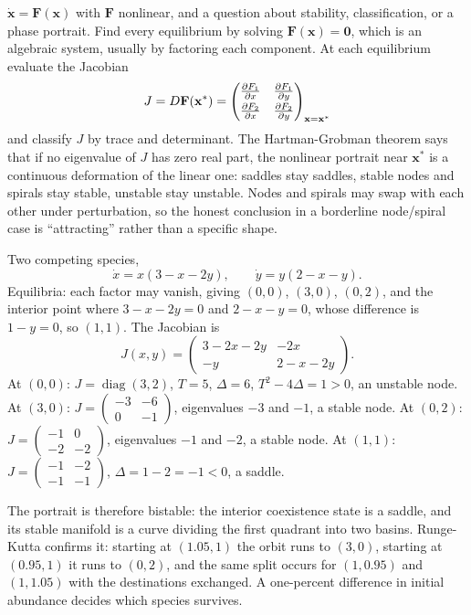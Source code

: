 \cue $\dot{\mathbf{x}}=\mathbf{F}(\mathbf{x})$ with $\mathbf{F}$ nonlinear, and a question about stability, classification, or a phase portrait.
\method Find every equilibrium by solving $\mathbf{F}(\mathbf{x})=\mathbf{0}$, which is an algebraic system, usually by factoring each component. At each equilibrium evaluate the Jacobian
\[J=D\mathbf{F}(\mathbf{x}^{*})=\begin{pmatrix}\frac{\partial F_1}{\partial x}&\frac{\partial F_1}{\partial y}\\[3pt]\frac{\partial F_2}{\partial x}&\frac{\partial F_2}{\partial y}\end{pmatrix}_{\mathbf{x}=\mathbf{x}^{*}}\]
and classify $J$ by trace and determinant. The Hartman-Grobman theorem says that if no eigenvalue of $J$ has zero real part, the nonlinear portrait near $\mathbf{x}^{*}$ is a continuous deformation of the linear one: saddles stay saddles, stable nodes and spirals stay stable, unstable stay unstable. Nodes and spirals may swap with each other under perturbation, so the honest conclusion in a borderline node/spiral case is ``attracting'' rather than a specific shape.

\begin{worked}
Two competing species,
\[\dot x=x(3-x-2y),\qquad \dot y=y(2-x-y).\]
Equilibria: each factor may vanish, giving $(0,0)$, $(3,0)$, $(0,2)$, and the interior point where $3-x-2y=0$ and $2-x-y=0$, whose difference is $1-y=0$, so $(1,1)$. The Jacobian is
\[J(x,y)=\begin{pmatrix}3-2x-2y&-2x\\-y&2-x-2y\end{pmatrix}.\]
At $(0,0)$: $J=\operatorname{diag}(3,2)$, $T=5$, $\Delta=6$, $T^{2}-4\Delta=1>0$, an unstable node. At $(3,0)$: $J=\begin{pmatrix}-3&-6\\0&-1\end{pmatrix}$, eigenvalues $-3$ and $-1$, a stable node. At $(0,2)$: $J=\begin{pmatrix}-1&0\\-2&-2\end{pmatrix}$, eigenvalues $-1$ and $-2$, a stable node. At $(1,1)$: $J=\begin{pmatrix}-1&-2\\-1&-1\end{pmatrix}$, $\Delta=1-2=-1<0$, a saddle.

The portrait is therefore bistable: the interior coexistence state is a saddle, and its stable manifold is a curve dividing the first quadrant into two basins. Runge-Kutta confirms it: starting at $(1.05,1)$ the orbit runs to $(3,0)$, starting at $(0.95,1)$ it runs to $(0,2)$, and the same split occurs for $(1,0.95)$ and $(1,1.05)$ with the destinations exchanged. A one-percent difference in initial abundance decides which species survives.
\end{worked}

